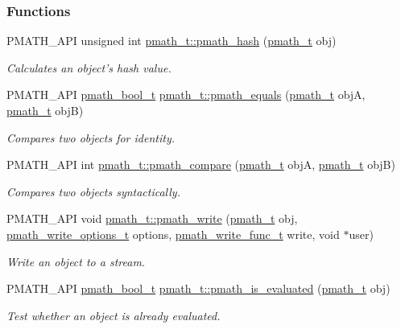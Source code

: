 \subsubsection*{Functions}
\begin{CompactItemize}
\item 
PMATH\_\-API unsigned int \hyperlink{group__objects_g9413cfb0b3fd00d361046189853a11d8}{pmath\_\-t::pmath\_\-hash} (\hyperlink{classpmath__t}{pmath\_\-t} obj)
\begin{CompactList}\small\item\em Calculates an object's hash value. \item\end{CompactList}\item 
PMATH\_\-API \hyperlink{group__general__types_gc92090cb0b56345d6c379ed2341d4ef4}{pmath\_\-bool\_\-t} \hyperlink{group__objects_g6475af7f7c85777392e38c570ac07892}{pmath\_\-t::pmath\_\-equals} (\hyperlink{classpmath__t}{pmath\_\-t} objA, \hyperlink{classpmath__t}{pmath\_\-t} objB)
\begin{CompactList}\small\item\em Compares two objects for identity. \item\end{CompactList}\item 
PMATH\_\-API int \hyperlink{group__objects_gc57589e08f5b3eed28e724c646503735}{pmath\_\-t::pmath\_\-compare} (\hyperlink{classpmath__t}{pmath\_\-t} objA, \hyperlink{classpmath__t}{pmath\_\-t} objB)
\begin{CompactList}\small\item\em Compares two objects syntactically. \item\end{CompactList}\item 
PMATH\_\-API void \hyperlink{group__objects_g9f909b9eb04317260ee8630d10e5a7c6}{pmath\_\-t::pmath\_\-write} (\hyperlink{classpmath__t}{pmath\_\-t} obj, \hyperlink{group__objects_gd83ea6a616c49cbe35b5d3dafb877f7e}{pmath\_\-write\_\-options\_\-t} options, \hyperlink{group__general__types_g781a2e0445795bb4e091470fb20497cc}{pmath\_\-write\_\-func\_\-t} write, void $\ast$user)
\begin{CompactList}\small\item\em Write an object to a stream. \item\end{CompactList}\item 
PMATH\_\-API \hyperlink{group__general__types_gc92090cb0b56345d6c379ed2341d4ef4}{pmath\_\-bool\_\-t} \hyperlink{group__objects_gb26224de5170fa688fa67dd2e85834e3}{pmath\_\-t::pmath\_\-is\_\-evaluated} (\hyperlink{classpmath__t}{pmath\_\-t} obj)
\begin{CompactList}\small\item\em Test whether an object is already evaluated. \item\end{CompactList}\end{CompactItemize}


